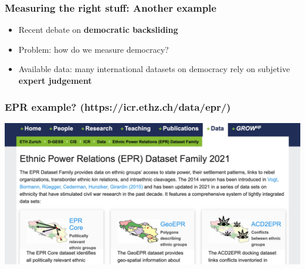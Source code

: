 \documentclass[aspectratio=43]{beamer}
\begin{document}
\begin{frame}
\frametitle{Measuring the right stuff: Another example}
\centering

\begin{itemize}
  \item Recent debate on \textbf{democratic backsliding}
  \item Problem: how do we measure democracy?
  \item Available data: many international datasets on democracy rely on subjetive \textbf{expert judgement}
\end{itemize}

\end{frame}



\begin{frame}
\frametitle{EPR example? (https://icr.ethz.ch/data/epr/)}
\centering

\includegraphics[width = \textwidth]{../img/epr1}

\end{frame}
\end{document}
